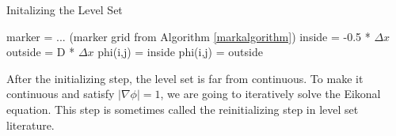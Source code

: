 \begin{algorithm}
\caption{Initalizing the Level Set}
\begin{algorithmic}
\STATE marker = ... (marker grid from Algorithm \ref{markalgorithm})
\STATE inside = -0.5 * $\Delta x$
\STATE outside = D * $\Delta x$
\STATE phi(i,j) = inside
\ELSE
\STATE phi(i,j) = outside
\ENDIF
\ENDFOR
\ENDFOR
\end{algorithmic}
\label{particlestogridalgorithm2}
\end{algorithm}
\noindent
After the initializing step, the level set is far from continuous. To make it continuous and satisfy $|\nabla \phi| = 1$, we are going to iteratively solve the Eikonal equation. This step is sometimes called the reinitializing step in level set literature.
